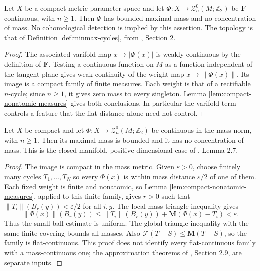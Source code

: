 \begin{proposition}\label{prop:f-continuity-no-concentration}
Let $X$ be a compact metric parameter space and let $\Phi:X\to\mathcal Z_n^0(M;\mathbb Z_2)$ be $\mathbf F$-continuous, with $n\geq1$. Then $\Phi$ has bounded maximal mass and no concentration of mass. No cohomological detection is implied by this assertion. The topology is that of Definition \ref{def:minmax-cycles}, from \cite{MNIndex}, Section 2.
\end{proposition}
\begin{proof}
The associated varifold map $x\mapsto|\Phi(x)|$ is weakly continuous by the definition of $\mathbf F$. Testing a continuous function on $M$ as a function independent of the tangent plane gives weak continuity of the weight map $x\mapsto\|\Phi(x)\|$. Its image is a compact family of finite measures. Each weight is that of a rectifiable $n$-cycle; since $n\geq1$, it gives zero mass to every singleton. Lemma \ref{lem:compact-nonatomic-measures} gives both conclusions. In particular the varifold term controls a feature that the flat distance alone need not control.
\end{proof}

\begin{proposition}\label{prop:mass-continuity-no-concentration}
Let $X$ be compact and let $\Phi:X\to\mathcal Z_n^0(M;\mathbb Z_2)$ be continuous in the mass norm, with $n\geq1$. Then its maximal mass is bounded and it has no concentration of mass. This is the closed-manifold, positive-dimensional case of \cite{LMN}, Lemma 2.7.
\end{proposition}
\begin{proof}
The image is compact in the mass metric. Given $\varepsilon>0$, choose finitely many cycles $T_1,\ldots,T_N$ so every $\Phi(x)$ is within mass distance $\varepsilon/2$ of one of them. Each fixed weight is finite and nonatomic, so Lemma \ref{lem:compact-nonatomic-measures}, applied to this finite family, gives $r>0$ such that $\|T_i\|(B_r(y))<\varepsilon/2$ for all $i,y$. The local mass triangle inequality gives
\[
 \|\Phi(x)\|(B_r(y))
 \leq\|T_i\|(B_r(y))+\mathbf M(\Phi(x)-T_i)<\varepsilon.
\]
Thus the small-ball estimate is uniform. The global triangle inequality with the same finite covering bounds all masses. Also $\mathcal F(T-S)\leq\mathbf M(T-S)$, so the family is flat-continuous. This proof does not identify every flat-continuous family with a mass-continuous one; the approximation theorems of \cite{LMN}, Section 2.9, are separate inputs.
\end{proof}

